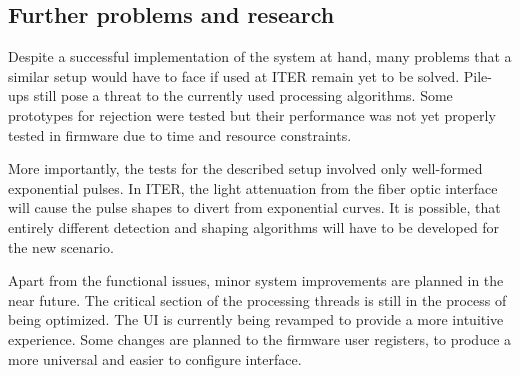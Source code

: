 \subsection{Further problems and research}

Despite a successful implementation of the system at hand, 
many problems that a similar setup would have to face if used at ITER remain yet to be solved.
Pile-ups still pose a threat to the currently used processing algorithms. 
Some prototypes for rejection
were tested but their performance was not yet properly tested in firmware
due to time and resource constraints.


More importantly, the tests for the described setup involved only well-formed exponential pulses.
In ITER, the light attenuation from the fiber optic interface
will cause the pulse shapes to divert from exponential curves.
It is possible, that entirely different detection and shaping
algorithms will have to be developed for the new scenario. 


Apart from the functional issues, minor system improvements are planned
in the near future. The critical section of the processing threads
is still in the process of being optimized. The UI is currently 
being revamped to provide a more intuitive experience. 
Some changes are planned to the firmware user registers, to produce
a more universal and easier to configure interface.